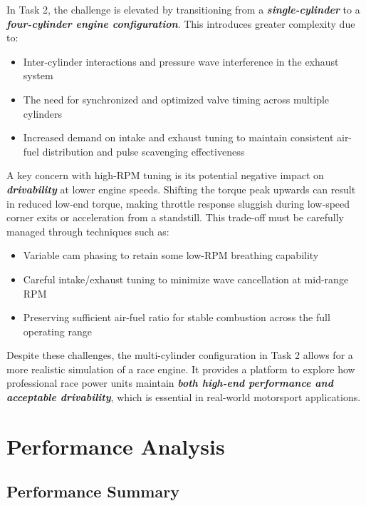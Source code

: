 In Task 2, the challenge is elevated by transitioning from a \textbf{\textit{single-cylinder}} to a \textbf{\textit{four-cylinder engine configuration}}. This introduces greater complexity due to:
\begin{itemize}
    \item Inter-cylinder interactions and pressure wave interference in the exhaust system
    \item The need for synchronized and optimized valve timing across multiple cylinders
    \item Increased demand on intake and exhaust tuning to maintain consistent air-fuel distribution and pulse scavenging effectiveness
\end{itemize}

A key concern with high-RPM tuning is its potential negative impact on \textbf{\textit{drivability}} at lower engine speeds. Shifting the torque peak upwards can result in reduced low-end torque, making throttle response sluggish during low-speed corner exits or acceleration from a standstill. This trade-off must be carefully managed through techniques such as:
\begin{itemize}
    \item Variable cam phasing to retain some low-RPM breathing capability
    \item Careful intake/exhaust tuning to minimize wave cancellation at mid-range RPM
    \item Preserving sufficient air-fuel ratio for stable combustion across the full operating range
\end{itemize}

Despite these challenges, the multi-cylinder configuration in Task 2 allows for a more realistic simulation of a race engine. It provides a platform to explore how professional race power units maintain \textbf{\textit{both high-end performance and acceptable drivability}}, which is essential in real-world motorsport applications.

\section{Performance Analysis}

\subsection{Performance Summary}

